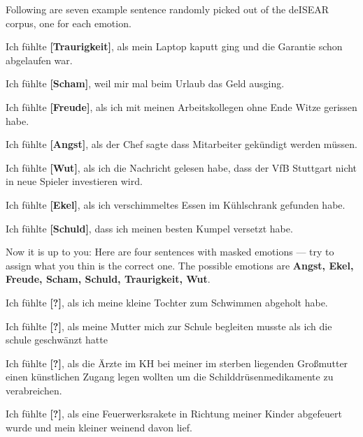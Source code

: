 Following are seven example sentence randomly picked out of the deISEAR corpus, one for each emotion.

\begin{examples}
  \item Ich fühlte \textbf{[Traurigkeit]}, als mein Laptop kaputt ging und die Garantie schon abgelaufen war.
  \item Ich fühlte \textbf{[Scham]}, weil mir mal beim Urlaub das Geld ausging.
  \item Ich fühlte \textbf{[Freude]}, als ich mit meinen Arbeitskollegen ohne Ende Witze gerissen habe.
  \item Ich fühlte \textbf{[Angst]}, als der Chef sagte dass Mitarbeiter gekündigt werden müssen.
  \item Ich fühlte \textbf{[Wut]}, als ich die Nachricht gelesen habe, dass der VfB Stuttgart nicht in neue Spieler investieren wird.
  \item Ich fühlte \textbf{[Ekel]}, als ich verschimmeltes Essen im Kühlschrank gefunden habe.
  \item Ich fühlte \textbf{[Schuld]}, dass ich meinen besten Kumpel versetzt habe.
\end{examples}

Now it is up to you: Here are four sentences with masked emotions --- try to assign what you thin is the correct one.
The possible emotions are \textbf{Angst, Ekel, Freude, Scham, Schuld, Traurigkeit, Wut}.


\begin{examples}
  \item \label{itm:deisear1} Ich fühlte \textbf{[?]}, als ich meine kleine Tochter zum Schwimmen abgeholt habe.
  \item \label{itm:deisear2} Ich fühlte \textbf{[?]}, als meine Mutter mich zur Schule begleiten musste als ich die schule geschwänzt hatte
  \item \label{itm:deisear3} Ich fühlte \textbf{[?]}, als die Ärzte im KH bei meiner im sterben liegenden Großmutter einen künstlichen Zugang legen wollten um die Schilddrüsenmedikamente zu verabreichen.
  \item \label{itm:deisear4} Ich fühlte \textbf{[?]}, als eine Feuerwerksrakete in Richtung meiner Kinder abgefeuert wurde und mein kleiner weinend davon lief.
\end{examples}



